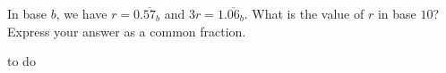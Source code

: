 In base $b$, we have ${r=0.\overline{57}_{b}}$ and $3r=1.\overline{06}_{b}$. What is the value of $r$ in base $10$? Express your answer as a common fraction. 
\begin{answer}
to do
\end{answer}
